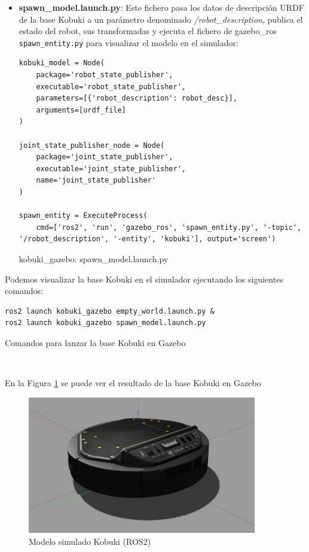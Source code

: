 \begin{itemize}
	\item \textbf{spawn\_model.launch.py}: Este fichero pasa los datos de descripción URDF de la base Kobuki a un parámetro denominado \textit{/robot\_description}, publica el estado del robot, sus transformadas y ejecuta el fichero de gazebo\_ros \texttt{spawn\_entity.py} para visualizar el modelo en el simulador:
	
\begin{code}[H]
\begin{lstlisting}[frame=single]
kobuki_model = Node(
	package='robot_state_publisher',
	executable='robot_state_publisher',
	parameters=[{'robot_description': robot_desc}],
	arguments=[urdf_file]
)

joint_state_publisher_node = Node(
	package='joint_state_publisher',
	executable='joint_state_publisher',
	name='joint_state_publisher'
)

spawn_entity = ExecuteProcess(
	cmd=['ros2', 'run', 'gazebo_ros', 'spawn_entity.py', '-topic', '/robot_description', '-entity', 'kobuki'], output='screen')
\end{lstlisting}
\caption[kobuki\_gazebo: spawn\_model.launch.py]{kobuki\_gazebo: spawn\_model.launch.py}
\label{cod:kobuki_gazebo_spawn_model}
\end{code}
\end{itemize}

Podemos visualizar la base Kobuki en el simulador ejecutando los siguientes comandos:\\

\begin{code}[H]
\begin{lstlisting}
ros2 launch kobuki_gazebo empty_world.launch.py &
ros2 launch kobuki_gazebo spawn_model.launch.py
\end{lstlisting}
\caption{Comandos para lanzar la base Kobuki en Gazebo}
\label{cod:comandos_kobuki_launch}
\end{code}\

En la Figura \ref{fig:sim_kobuki_base} se puede ver el resultado de la base Kobuki en Gazebo
\begin{figure} [H]
  \begin{center}
    \includegraphics[width=10cm]{imagenes/cap4/sim_kobuki_base.png}
  \end{center}
  \caption[Modelo simulado Kobuki (ROS2)]{Modelo simulado Kobuki (ROS2)}
  \label{fig:sim_kobuki_base}
\end{figure}\



